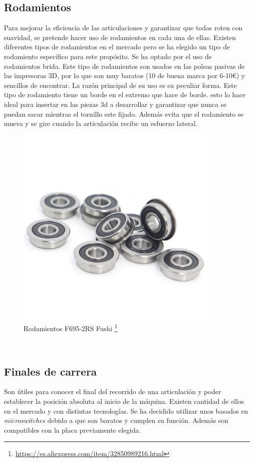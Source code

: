 \subsection{Rodamientos}
Para mejorar la eficiencia de las articulaciones y garantizar que todas roten con suavidad, se pretende hacer uso de rodamientos 
en cada una de ellas. 
Existen diferentes tipos de rodamientos en el mercado pero se ha elegido un tipo de rodamiento específico para este propósito. 
Se ha optado por el uso de rodamientos brida. Este tipo de rodamientos son usados en las poleas pasivas de las impresoras 3D, por lo 
que son muy baratos (10 de buena marca por 6-10€) y sencillos de encontrar. La razón principal de su uso es su peculiar forma. Este tipo 
de rodamiento tiene un borde en el extremo que hace de borde. esto lo hace ideal para insertar en las piezas 3d a desarrollar y garantizar 
que nunca se puedan sacar mientras el tornillo este fijado. Además evita que el rodamiento se mueva y se gire cuando la articulación 
recibe un esfuerzo lateral. 

\begin{figure} [ht!]
  \begin{center}
    \includegraphics[width=10cm]{figs/F695-2RS.jpeg}
  \end{center}
  \caption{Rodamientos F695-2RS Fushi \footnote{\url{https://es.aliexpress.com/item/32850989216.html}}}
\end{figure}\ 

\subsection{Finales de carrera}
Son útiles para conocer el final del recorrido de una articulación y poder establecer la posición absoluta al inicio de la 
máquina. 
Existen cantidad de ellos en el mercado y con distintas tecnologías. Se ha decidido utilizar unos basados en \textit{microswitches} debido a 
que son baratos y cumplen su función. Además son compatibles con la placa previamente elegida. 
